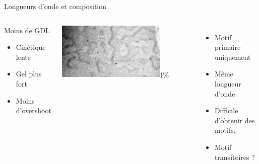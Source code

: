 \documentclass{beamer}
\begin{document}
\begin{frame}{Longueurs d'onde et composition}
\begin{columns}[T]\small

\begin{block}{Moins de GDL}
\begin{itemize}
		\item Cinétique lente
		\item Gel plus fort
		\item Moins d'overshoot
	\end{itemize}
\end{block}
\includegraphics[width=0.75\textwidth]{cas4_GDL1.jpg}1\%
\begin{itemize}
\item Motif primaire uniquement 
\item Même longueur d'onde
\item Difficile d'obtenir des motifs,
\item Motif transitoires ?
\end{itemize}


\end{columns}
\end{frame}
\end{document}

